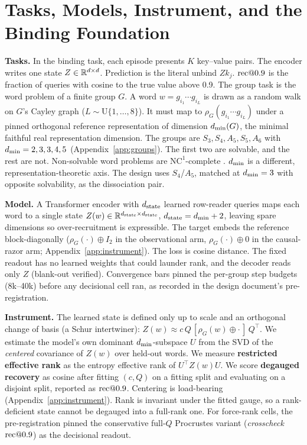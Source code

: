 \section{Tasks, Models, Instrument, and the Binding Foundation}
\label{sec:setup}

\textbf{Tasks.} In the binding task, each episode presents $K$ key--value
pairs. The encoder writes one state $Z \in \mathbb{R}^{d \times d}$. Prediction is
the literal unbind $Z k_j$. $\mathrm{rec}@0.9$ is the fraction of queries with
cosine to the true value above 0.9. The group task is the word problem of a
finite group $G$. A word $w = g_{i_1} \cdots g_{i_L}$ is drawn as a random
walk on $G$'s Cayley graph ($L \sim \mathrm{U}\{1,\dots,8\}$). It must map
to $\rho_G(g_{i_1} \cdots g_{i_L})$ under a pinned orthogonal reference
representation of dimension $d_{\min}(G)$, the minimal faithful real
representation dimension. The groups are $S_3, S_4, A_5, S_5, A_6$ with
$d_{\min} = 2, 3, 3, 4, 5$ (Appendix~\ref{app:groups}). The first two are
solvable, and the rest are not. Non-solvable word problems are
$\mathrm{NC}^1$-complete \citep{barrington1989,barringtontherien1988}.
$d_{\min}$ is a different, representation-theoretic axis. The design uses
$S_4$/$A_5$, matched at $d_{\min} = 3$ with opposite solvability, as the
dissociation pair.

\textbf{Model.} A Transformer encoder with $d_{\mathrm{state}}$ learned row-reader
queries maps each word to a single state
$Z(w) \in \mathbb{R}^{d_{\mathrm{state}} \times d_{\mathrm{state}}}$, $d_{\mathrm{state}} = d_{\min} + 2$, leaving
spare dimensions so over-recruitment is expressible. The target embeds
the reference block-diagonally ($\rho_G(\cdot) \oplus I_2$ in the
observational arm, $\rho_G(\cdot) \oplus 0$ in the causal-razor arm;
Appendix~\ref{app:instrument}). The loss is cosine distance. The fixed
readout has no learned weights that could launder rank, and the decoder
reads only $Z$ (blank-out verified). Convergence bars pinned the per-group step
budgets (8k--40k) before any decisional cell ran, as recorded in the design
document's pre-registration.

\textbf{Instrument.} The learned state is defined only up to scale and an
orthogonal change of basis (a Schur intertwiner):
$Z(w) \approx c\,Q\,[\rho_G(w) \oplus \cdot\,]\,Q^{\top}$. We estimate the
model's own dominant $d_{\min}$-subspace $U$ from the SVD of the
\emph{centered} covariance of $Z(w)$ over held-out words. We measure
\textbf{restricted effective rank} as the entropy effective rank of
$U^{\top} Z(w) U$. We score \textbf{degauged recovery} as cosine after fitting
$(c, Q)$ on a fitting split and evaluating on a disjoint split, reported as
$\mathrm{rec}@0.9$. Centering is load-bearing (Appendix~\ref{app:instrument}). Rank
is invariant under the fitted gauge, so a rank-deficient state cannot be
degauged into a full-rank one. For force-rank cells, the pre-registration
pinned the conservative full-$Q$ Procrustes variant (\emph{crosscheck}
$\mathrm{rec}@0.9$) as the decisional readout.
